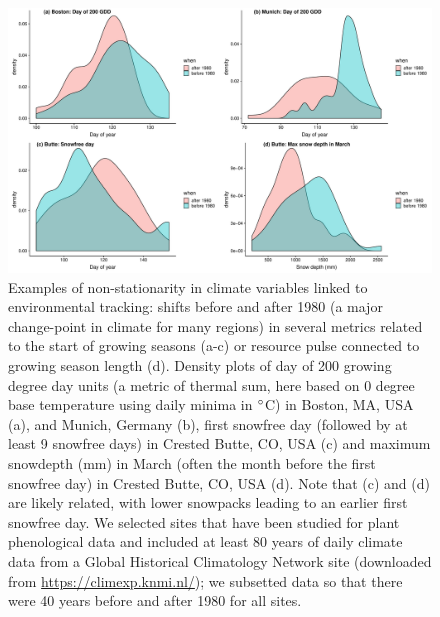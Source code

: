 \documentclass[11pt,letterpaper]{article}
\begin{document}

\clearpage

\begin{figure}[t!]
\centering
\includegraphics[width=1\textwidth]{..//..//R/graphs/otherdat/climdata.pdf}
\caption{Examples of non-stationarity in climate variables linked to environmental tracking: shifts before and after 1980 (a major change-point in climate for many regions) in several metrics related to the start of growing seasons (a-c) or resource pulse connected to growing season length (d). Density plots of day of 200 growing degree day units (a metric of thermal sum, here based on 0 degree base temperature using daily minima in $\degree$C) in Boston, MA, USA (a), and Munich, Germany (b), first snowfree day (followed by at least 9 snowfree days) in Crested Butte, CO, USA (c) and maximum snowdepth (mm) in March (often the month before the first snowfree day) in Crested Butte, CO, USA (d). Note that (c) and (d) are likely related, with lower snowpacks leading to an earlier first snowfree day. We selected sites that have been studied for plant phenological data and included at least 80 years of daily climate data from a Global Historical Climatology Network site (downloaded from \url{https://climexp.knmi.nl/}); we subsetted data so that there were 40 years before and after 1980 for all sites.}
 \label{fig:climdat}
\end{figure}
\end{document}

